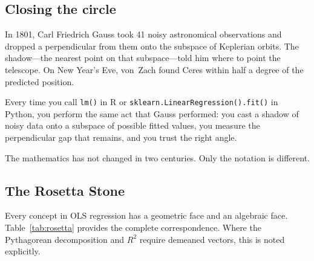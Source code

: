 \documentclass[11pt,a4paper]{article}
\theoremstyle{plain}
\theoremstyle{definition}
\begin{document}
\subsection*{Closing the circle}

In 1801, Carl Friedrich Gauss took 41 noisy astronomical observations and
dropped a perpendicular from them onto the subspace of Keplerian orbits.
The shadow---the nearest point on that subspace---told him where to
point the telescope.  On New Year's Eve, von~Zach found Ceres within
half a degree of the predicted position.

Every time you call \texttt{lm()} in R or
\texttt{sklearn.LinearRegression().fit()} in Python, you perform
the same act that Gauss performed: you cast a shadow of noisy data
onto a subspace of possible fitted values, you measure the
perpendicular gap that remains, and you trust the right angle.

The mathematics has not changed in two centuries.  Only the notation
is different.

\subsection*{The Rosetta Stone}

Every concept in OLS regression has a geometric face and an algebraic
face.  Table~\ref{tab:rosetta} provides the complete correspondence.
Where the Pythagorean decomposition and $R^2$ require demeaned vectors,
this is noted explicitly.
\end{document}
